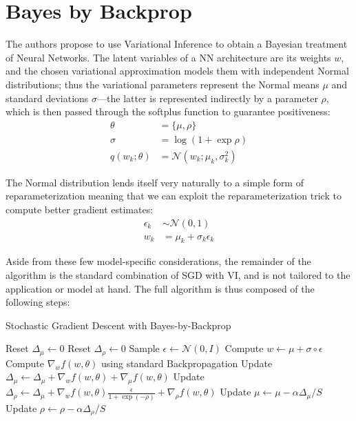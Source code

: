 \documentclass[11pt]{article}
\begin{document}
\section{Bayes by Backprop} \label{sec:bayes_by_backprop}

The authors propose to use Variational Inference to obtain a Bayesian treatment
of Neural Networks.  The latent variables of a NN architecture are its weights
$w$, and the chosen variational approximation models them with independent
Normal distributions;  thus the variational parameters represent the Normal
means $\mu$ and standard deviations $\sigma$---the latter is represented
indirectly by a parameter $\rho$, which is then passed through the softplus
function to guarantee positiveness:
%
\begin{align}
  \theta &= \{ \mu, \rho \} \\
  \sigma &= \log(1 + \exp\rho) \\
  q(w_k; \theta) &= \mathcal{N}(w_k; \mu_k, \sigma_k^2)
\end{align}


The Normal distribution lends itself very naturally to a simple form of
reparameterization meaning that we can exploit the reparameterization trick to
compute better gradient estimates:
%
\begin{align}
  \epsilon_k &\sim \mathcal{N}(0, 1) \\
  w_k &= \mu_k + \sigma_k \epsilon_k
\end{align}

Aside from these few model-specific considerations, the remainder of the
algorithm is the standard combination of SGD with VI, and is not tailored to
the application or model at hand.  The full algorithm is thus composed of the
following steps:

\begin{algorithm}
\caption{Stochastic Gradient Descent with Bayes-by-Backprop}
\begin{algorithmic}[1]
  \Repeat
  \State Reset $\Delta_\mu \gets 0$
  \State Reset $\Delta_\rho \gets 0$
  \State Sample $\epsilon \gets \mathcal{N}(0, I)$
  \State Compute $w \gets \mu + \sigma \circ \epsilon$
  \State Compute $\nabla_w f(w, \theta)$ using standard Backpropagation
  \State Update $\Delta_\mu \gets \Delta_\mu + \nabla_w f(w, \theta) + \nabla_\mu f(w, \theta)$
  \State Update $\Delta_\rho \gets \Delta_\mu + \nabla_w f(w, \theta) \frac{\epsilon}{1+\exp(-\rho)} + \nabla_\rho f(w, \theta)$
  \EndFor
  \State Update $\mu \gets \mu - \alpha \Delta_\mu / S$
  \State Update $\rho \gets \rho - \alpha \Delta_\rho / S$
\end{algorithmic}
\end{algorithm}
\end{document}
